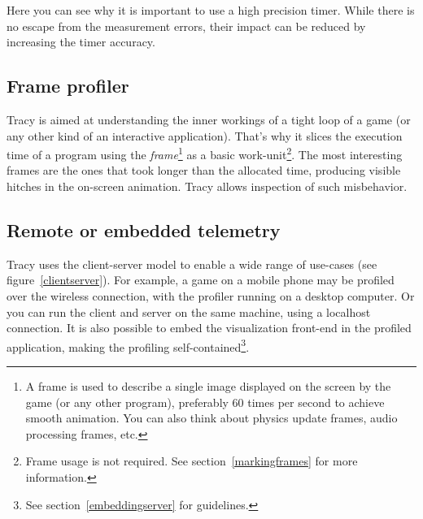 \documentclass[hidelinks,titlepage,a4paper]{article}
\begin{document}
Here you can see why it is important to use a high precision timer. While there is no escape from the measurement errors, their impact can be reduced by increasing the timer accuracy.

\subsection{Frame profiler}

Tracy is aimed at understanding the inner workings of a tight loop of a game (or any other kind of an interactive application). That's why it slices the execution time of a program using the \emph{frame}\footnote{A frame is used to describe a single image displayed on the screen by the game (or any other program), preferably 60 times per second to achieve smooth animation. You can also think about physics update frames, audio processing frames, etc.} as a basic work-unit\footnote{Frame usage is not required. See section~\ref{markingframes} for more information.}. The most interesting frames are the ones that took longer than the allocated time, producing visible hitches in the on-screen animation. Tracy allows inspection of such misbehavior.

\subsection{Remote or embedded telemetry}

Tracy uses the client-server model to enable a wide range of use-cases (see figure~\ref{clientserver}). For example, a game on a mobile phone may be profiled over the wireless connection, with the profiler running on a desktop computer. Or you can run the client and server on the same machine, using a localhost connection. It is also possible to embed the visualization front-end in the profiled application, making the profiling self-contained\footnote{See section~\ref{embeddingserver} for guidelines.}.
\end{document}
